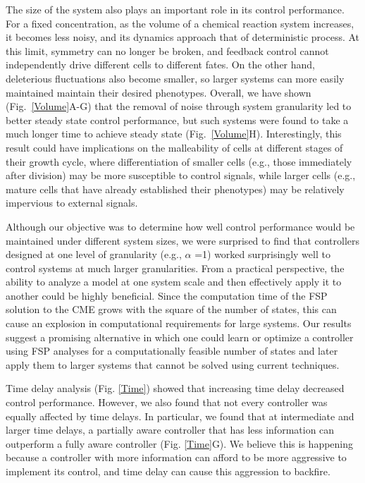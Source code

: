 \documentclass[12pt]{iopart}
\begin{document}
The size of the system also plays an important role in its control performance. 
For a fixed concentration, as the volume of a chemical reaction system increases, it becomes less noisy, and its dynamics approach that of deterministic process. 
At this limit, symmetry can no longer be broken, and feedback control cannot independently drive different cells to different fates.  
On the other hand, deleterious fluctuations also become smaller, so larger systems can more easily maintained maintain their desired phenotypes.
Overall, we have shown (Fig.\ \ref{Volume}A-G) that the removal of noise through system granularity led to better steady state control performance, but  such systems were found to take a much longer time to achieve steady state (Fig.\ \ref{Volume}H). 
Interestingly, this result could have implications on the malleability of cells at different stages of their growth cycle, where differentiation of smaller cells (e.g., those immediately after division) may be more susceptible to control signals, while larger cells (e.g., mature cells that have already established their phenotypes) may be relatively impervious to external signals.

Although our objective was to determine how well control performance would be maintained under different system sizes, we were surprised to find that controllers designed at one level of granularity (e.g., $\alpha$ =1) worked surprisingly well to control systems at much larger granularities. 
From a practical perspective, the ability to analyze a model at one system scale and then effectively apply it to another could be highly beneficial. 
Since the computation time of the FSP solution to the CME grows with the square of the number of states, this can cause an explosion in computational requirements for large systems. 
Our results suggest a promising alternative in which one could learn or optimize a controller using FSP analyses for a computationally feasible number of states and later apply them to larger systems that cannot be solved using current techniques.

Time delay analysis (Fig. \ref{Time}) showed that increasing time delay decreased control performance. However, we also found that not every controller was equally affected by time delays. In particular, we found that at intermediate and larger time delays, a partially aware controller that has  less information can outperform a fully aware controller (Fig. \ref{Time}G). We believe this is happening because a controller with more information can afford to be more aggressive to implement its control, and time delay can cause this aggression to backfire.
\end{document}
